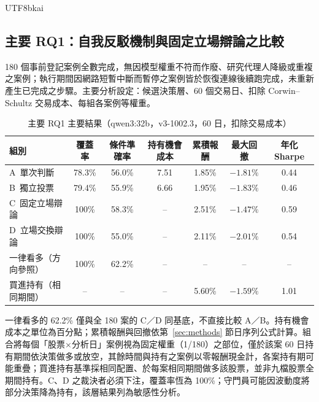 \documentclass[12pt,a4paper]{article}
\newcommand{\grp}[1]{\textsf{#1}}
\begin{document}
\begin{CJK}{UTF8}{bkai}
\subsection{主要 RQ1：自我反駁機制與固定立場辯論之比較}
\label{sec:formalresults}

180 個事前登記案例全數完成，無因模型權重不符而作廢、研究代理人降級或重複之案例；執行期間因網路短暫中斷而暫停之案例皆於恢復連線後續跑完成，未重新產生已完成之步驟。主要分析設定：候選決策層、60 個交易日、扣除 Corwin--Schultz 交易成本、每組各案例等權重。

\begin{table}[H]
\centering\footnotesize
\caption{主要 RQ1 主要結果（qwen3:32b，v3-1002.3，60 日，扣除交易成本）}
\label{tab:formalmain}
\begin{tabular}{@{}lcccccc@{}}
\toprule
組別 & 覆蓋率 & 條件準確率 & 持有機會成本 & 累積報酬 & 最大回撤 & 年化 Sharpe \\
\midrule
\grp{A}\ 單次判斷 & 78.3\% & 56.0\% & 7.51 & 1.85\% & $-1.81\%$ & 0.44 \\
\grp{B}\ 獨立投票 & 79.4\% & 55.9\% & 6.66 & 1.95\% & $-1.83\%$ & 0.46 \\
\grp{C}\ 固定立場辯論 & 100\% & 58.3\% & -- & 2.51\% & $-1.47\%$ & 0.59 \\
\grp{D}\ 立場交換辯論 & 100\% & 55.0\% & -- & 2.11\% & $-2.01\%$ & 0.54 \\
一律看多（方向參照） & 100\% & 62.2\% & -- & -- & -- & -- \\
\midrule
買進持有（相同期間） & -- & -- & -- & 5.60\% & $-1.59\%$ & 1.01 \\
\bottomrule
\end{tabular}
\par\smallskip
\raggedright\footnotesize 一律看多的 62.2\% 僅與全 180 案的 C／D 同基底，不直接比較 A／B。持有機會成本之單位為百分點；累積報酬與回撤依第~\ref{sec:methods} 節日序列公式計算。組合將每個「股票×分析日」案例視為固定權重（1/180）之部位，僅於該案 60 日持有期間依決策做多或放空，其餘時間與持有之案例以零報酬現金計，各案持有期可能重疊；買進持有基準採相同配置、於每案相同期間做多該股票，並非九檔股票全期間持有。\grp{C}、\grp{D} 之裁決者必須下注，覆蓋率恆為 100\%；守門員可能因波動度將部分決策降為持有，該層結果列為敏感性分析。
\end{table}


\end{CJK}
\end{document}
